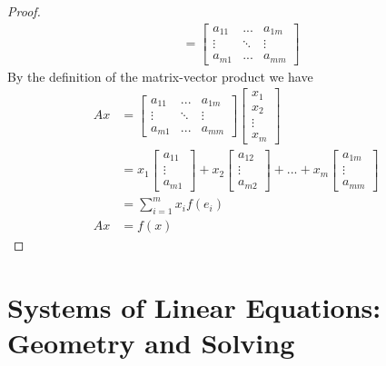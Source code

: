 \documentclass[11pt]{article}
\begin{document}
\begin{proof}
\begin{align*}
        &=
        \begin{bmatrix}
            a_{11} & ... & a_{1m} \\
            \vdots & \ddots & \vdots \\
            a_{m1} & ... & a_{mm}
        \end{bmatrix}
    \end{align*}
    By the definition of the matrix-vector product we have
    \begin{align*}
        Ax&=
        \begin{bmatrix}
            a_{11} & ... & a_{1m} \\
            \vdots & \ddots & \vdots \\
            a_{m1} & ... & a_{mm}
        \end{bmatrix}
        \begin{bmatrix}
            x_1 \\
            x_2 \\
            \vdots \\
            x_m
        \end{bmatrix} \\
        &=
        x_1
        \begin{bmatrix}
            a_{11} \\
            \vdots \\
            a_{m1}
        \end{bmatrix}
        +x_2
        \begin{bmatrix}
            a_{12} \\
            \vdots \\
            a_{m2}
        \end{bmatrix}
        + ...
        +x_m
        \begin{bmatrix}
            a_{1m} \\
            \vdots \\
            a_{mm}
        \end{bmatrix} \\
        &=
        \sum_{i=1}^{m} x_i f(e_i) \\
        Ax&=
        f(x)
    \end{align*}

\end{proof}
\newpage

\section{Systems of Linear Equations: Geometry and Solving}
\end{document}
